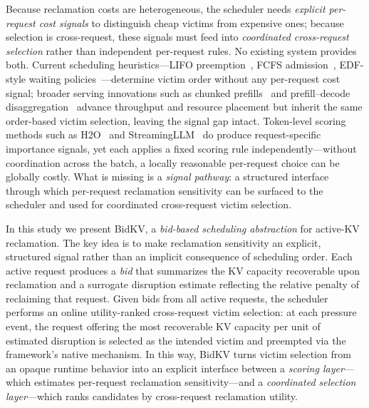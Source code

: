 \documentclass[sigconf,nonacm]{acmart}
\newcommand{\bidkv}{BidKV\xspace}
\begin{document}
Because reclamation costs are heterogeneous, the scheduler needs
\emph{explicit per-request cost signals} to distinguish cheap victims from
expensive ones; because selection is cross-request, these signals must feed
into \emph{coordinated cross-request selection} rather than independent
per-request rules.  No existing system provides both.  Current scheduling
heuristics---LIFO preemption~\cite{Kwon2023}, FCFS
admission~\cite{Yu2022}, EDF-style waiting
policies~\cite{Gujarati2020}---determine victim order without any
per-request cost signal; broader serving innovations such as chunked
prefills~\cite{Agrawal2024sarathiserve} and prefill--decode
disaggregation~\cite{Zhong2024, Patel2024} advance throughput and resource
placement but inherit the same order-based victim selection, leaving the
signal gap intact.  Token-level scoring methods such as
H2O~\cite{Zhang2023h2o} and StreamingLLM~\cite{Xiao2024} do produce
request-specific importance signals, yet each applies a fixed scoring rule
independently---without coordination across the batch, a locally reasonable
per-request choice can be globally costly.  What is missing is a
\emph{signal pathway}: a structured interface through which per-request
reclamation sensitivity can be surfaced to the scheduler and used for
coordinated cross-request victim selection.

In this study we present \bidkv, a \emph{bid-based scheduling abstraction} for
active-KV reclamation.  The key idea is to make reclamation sensitivity an
explicit, structured signal rather than an implicit consequence of scheduling
order.  Each active request produces a \emph{bid} that summarizes the KV
capacity recoverable upon reclamation and a surrogate disruption estimate
reflecting the relative penalty of reclaiming that request.  Given bids from all active requests, the scheduler performs an online
utility-ranked cross-request victim selection: at each pressure event, the
request offering the most recoverable KV capacity per unit of estimated
disruption is selected as the intended victim and preempted via the
framework's native mechanism.  In this way, \bidkv turns victim
selection from an opaque runtime behavior into an explicit interface between a
\emph{scoring layer}---which estimates per-request reclamation
sensitivity---and a \emph{coordinated selection layer}---which ranks candidates by
cross-request reclamation utility.
\end{document}
